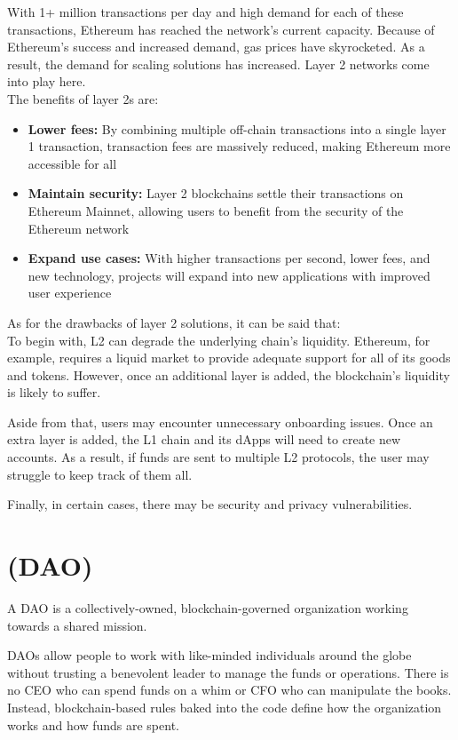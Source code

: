 \documentclass[MSE,Master,english]{twbook}%
\begin{document}
With 1+ million transactions per day and high demand for each of these transactions, Ethereum has reached the network's current capacity. Because of Ethereum's success and increased demand, gas prices have skyrocketed. As a result, the demand for scaling solutions has increased. Layer 2 networks come into play here. \\

The benefits of layer 2s are:
\begin{itemize}
  \item \textbf{Lower fees:} By combining multiple off-chain transactions into a single layer 1 transaction, transaction fees are massively reduced, making Ethereum more accessible for all
  \item \textbf{Maintain security:} Layer 2 blockchains settle their transactions on Ethereum Mainnet, allowing users to benefit from the security of the Ethereum network
  \item \textbf{Expand use cases:} With higher transactions per second, lower fees, and new technology, projects will expand into new applications with improved user experience
\end{itemize}

As for the drawbacks of layer 2 solutions, it can be said that: \\

To begin with, L2 can degrade the underlying chain's liquidity.\cite{l2Drawbacks} Ethereum, for example, requires a liquid market to provide adequate support for all of its goods and tokens. However, once an additional layer is added, the blockchain's liquidity is likely to suffer.

Aside from that, users may encounter unnecessary onboarding issues. Once an extra layer is added, the L1 chain and its dApps will need to create new accounts. As a result, if funds are sent to multiple L2 protocols, the user may struggle to keep track of them all.

Finally, in certain cases, there may be security and privacy vulnerabilities.

\section{ (DAO)}
A DAO\cite{DAO} is a collectively-owned, blockchain-governed organization working towards a shared mission.

DAOs allow people to work with like-minded individuals around the globe\cite{DAO} without trusting a benevolent leader to manage the funds or operations. There is no CEO who can spend funds on a whim or CFO who can manipulate the books. Instead, blockchain-based rules baked into the code define how the organization works and how funds are spent.
\end{document}
